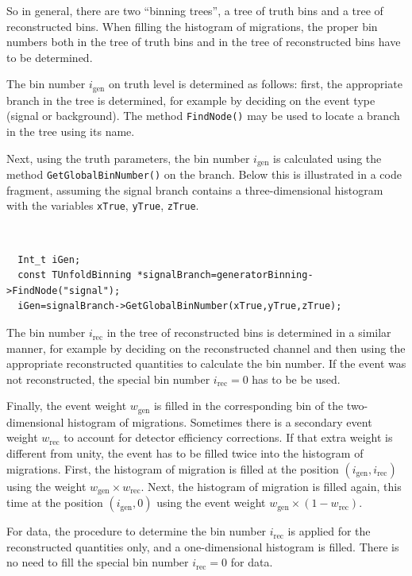 \documentclass[12pt]{article}
\begin{document}
So in general, there are two ``binning trees'', a tree of truth bins
and a tree of reconstructed bins. When filling the histogram of
migrations, the proper bin numbers both  in the tree of truth bins and
in the tree of reconstructed bins have to be determined.

The bin number $i_{\text{gen}}$ on truth level is determined as
follows: first, the appropriate branch in the tree is determined, for
example by deciding on the event type (signal or background).
The method {\tt FindNode()} may be used to locate a branch in the tree
using its name.

Next, using the truth parameters, the bin number $i_{\text{gen}}$ is
calculated using the method {\tt GetGlobalBinNumber()} on the
branch. Below this is illustrated in a code fragment, assuming the
signal branch contains a three-dimensional histogram with the
variables {\tt xTrue}, {\tt yTrue}, {\tt zTrue}.

{\tt
\begin{verbatim}
  Int_t iGen;
  const TUnfoldBinning *signalBranch=generatorBinning->FindNode("signal");
  iGen=signalBranch->GetGlobalBinNumber(xTrue,yTrue,zTrue);
\end{verbatim}
}

The bin number $i_{\text{rec}}$ in the
tree of reconstructed bins is determined in a similar manner, for
example by deciding on the reconstructed channel and then using the
appropriate reconstructed quantities to calculate the bin number.
If the event was not reconstructed, the special bin number
$i_{\text{rec}}=0$ has to be be used.

Finally, the event weight $w_{\text{gen}}$ is filled in the
corresponding bin of the two-dimensional histogram of
migrations. Sometimes there is a secondary event weight
$w_{\text{rec}}$ to account for detector efficiency corrections. If
that extra weight is different from unity, the
event has to be filled twice into the histogram of migrations. First,
the histogram of migration is filled at the position
$(i_{\text{gen}},i_{\text{rec}})$ using the weight
$w_{\text{gen}}\times w_{\text{rec}}$.
Next, the histogram of migration is filled again, this time at the
position $(i_{\text{gen}},0)$  using the event weight $w_{\text{gen}}\times(1-w_{\text{rec}})$.

For data, the procedure to determine the bin number $i_{\text{rec}}$
is applied for the reconstructed quantities only, and a
one-dimensional histogram is filled. There is no need to fill the
special bin number $i_{\text{rec}}=0$ for data.
\end{document}
